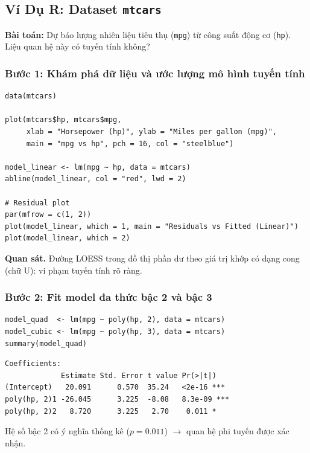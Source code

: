 \subsection{Ví Dụ R: Dataset \texttt{mtcars}}

\textbf{Bài toán:} Dự báo lượng nhiên liệu tiêu thụ (\texttt{mpg}) từ công suất động cơ (\texttt{hp}). Liệu quan hệ này có tuyến tính không?

\subsubsection*{Bước 1: Khám phá dữ liệu và ước lượng mô hình tuyến tính}

\begin{lstlisting}[style=Rstyle]
data(mtcars)

plot(mtcars$hp, mtcars$mpg,
     xlab = "Horsepower (hp)", ylab = "Miles per gallon (mpg)",
     main = "mpg vs hp", pch = 16, col = "steelblue")

model_linear <- lm(mpg ~ hp, data = mtcars)
abline(model_linear, col = "red", lwd = 2)

# Residual plot
par(mfrow = c(1, 2))
plot(model_linear, which = 1, main = "Residuals vs Fitted (Linear)")
plot(model_linear, which = 2)
\end{lstlisting}

\textbf{Quan sát.} Đường LOESS trong đồ thị phần dư theo giá trị khớp có dạng cong (chữ U): vi phạm tuyến tính rõ ràng.

\subsubsection*{Bước 2: Fit model đa thức bậc 2 và bậc 3}

\begin{lstlisting}[style=Rstyle]
model_quad  <- lm(mpg ~ poly(hp, 2), data = mtcars)
model_cubic <- lm(mpg ~ poly(hp, 3), data = mtcars)
summary(model_quad)
\end{lstlisting}

\begin{lstlisting}[style=output]
Coefficients:
             Estimate Std. Error t value Pr(>|t|)
(Intercept)   20.091      0.570  35.24   <2e-16 ***
poly(hp, 2)1 -26.045      3.225  -8.08   8.3e-09 ***
poly(hp, 2)2   8.720      3.225   2.70    0.011 *
\end{lstlisting}

Hệ số bậc 2 có ý nghĩa thống kê ($p = 0.011$) $\to$ quan hệ phi tuyến được xác nhận.

